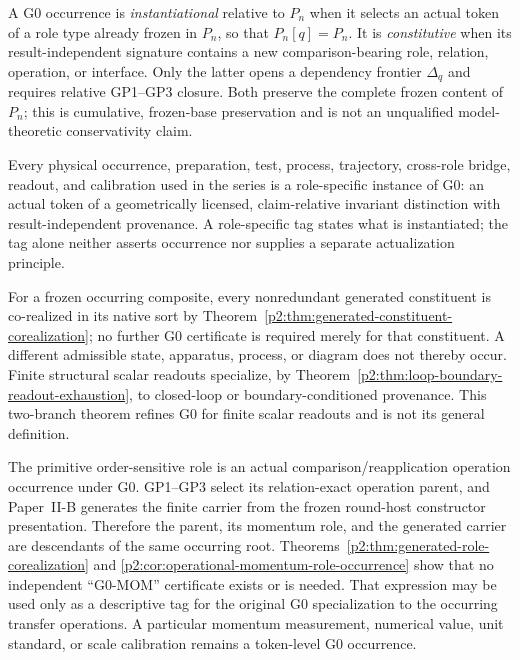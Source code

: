 \documentclass[12pt,a4paper]{article}
\begin{document}
\begin{definition}
\label{p2:def:g0-occurrence-types}
A G0 occurrence is \emph{instantiational} relative to \(P_n\) when it selects
an actual token of a role type already frozen in \(P_n\), so that
\(P_n[q]=P_n\).  It is \emph{constitutive} when its result-independent
signature contains a new comparison-bearing role, relation, operation, or
interface.  Only the latter opens a dependency frontier \(\Delta_q\) and
requires relative GP1--GP3 closure.  Both preserve the complete frozen content
of \(P_n\); this is cumulative, frozen-base preservation and is not an
unqualified model-theoretic conservativity claim.
\end{definition}

\begin{corollary}
\label{p2:cor:g0-witness-normal-form}
Every physical occurrence, preparation, test, process, trajectory, cross-role
bridge, readout, and calibration used in the series is a role-specific
instance of G0: an actual token of a geometrically licensed, claim-relative
invariant distinction with result-independent provenance.  A role-specific
tag states what is instantiated; the tag alone neither asserts occurrence nor
supplies a separate actualization principle.

For a frozen occurring composite, every nonredundant generated constituent is
co-realized in its native sort by
Theorem~\ref{p2:thm:generated-constituent-corealization}; no further G0
certificate is required merely for that constituent.  A different admissible
state, apparatus, process, or diagram does not thereby occur.  Finite
structural scalar readouts specialize, by
Theorem~\ref{p2:thm:loop-boundary-readout-exhaustion}, to closed-loop or
boundary-conditioned provenance.  This two-branch theorem refines G0 for
finite scalar readouts and is not its general definition.
\end{corollary}

\begin{remark}
\label{p2:rem:g0-mom-open}
The primitive order-sensitive role is an actual comparison/reapplication
operation occurrence under G0.  GP1--GP3 select its relation-exact operation
parent, and Paper~II-B generates the finite carrier from the frozen
round-host constructor presentation.  Therefore the parent, its momentum
role, and the generated carrier are descendants of the same occurring root.
Theorems~\ref{p2:thm:generated-role-corealization} and
\ref{p2:cor:operational-momentum-role-occurrence} show that no independent
``G0-MOM'' certificate exists or is needed.  That expression may be used only
as a descriptive tag for the original G0 specialization to the occurring
transfer operations.  A particular momentum measurement, numerical value,
unit standard, or scale calibration remains a token-level G0 occurrence.
\end{remark}
\end{document}
